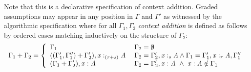 \begin{definition}
Note that this is a declarative specification of context addition. Graded
assumptions may appear in any position in $\Gamma$ and $\Gamma'$ as witnessed by
the algorithmic specification where for all $\Gamma_{{\mathrm{1}}}, \Gamma_{{\mathrm{2}}}$
  \emph{context addition} is defined
as follows by ordered cases matching inductively on the structure of
$\Gamma_{{\mathrm{2}}}$:
\begin{align*}
\Gamma_{{\mathrm{1}}}  \GRANULEsym{+}  \Gamma_{{\mathrm{2}}} = \left\{\begin{matrix}
    \begin{array}{ll}
    \Gamma_{{\mathrm{1}}} &
     \Gamma_{{\mathrm{2}}} = \emptyset
             \\
      ((\Gamma'_{{\mathrm{1}}}, \Gamma''_{{\mathrm{1}}}) + \Gamma'_{{\mathrm{2}}}), \GRANULEmv{x}  :_{\textcolor{coeffectColor}{  \GRANULEsym{(}  \GRANULEnt{r}  \GRANULEsym{+}  \GRANULEnt{s}  \GRANULEsym{)}  } }   \GRANULEnt{A} \; &
\Gamma_{{\mathrm{2}}} = \Gamma'_{{\mathrm{2}}}  \GRANULEsym{,}   \GRANULEmv{x}  :_{\textcolor{coeffectColor}{  \GRANULEnt{s}  } }   \GRANULEnt{A} \wedge \Gamma_{{\mathrm{1}}} = \Gamma'_{{\mathrm{1}}}  \GRANULEsym{,}   \GRANULEmv{x}  :_{\textcolor{coeffectColor}{  \GRANULEnt{r}  } }   \GRANULEnt{A},\Gamma''_{{\mathrm{1}}}  \\
 (\Gamma_{{\mathrm{1}}} + \Gamma'_{{\mathrm{2}}}), \GRANULEmv{x}  :  \GRANULEnt{A} & \Gamma_{{\mathrm{2}}} = \Gamma'_{{\mathrm{2}}}  \GRANULEsym{,}   \GRANULEmv{x}  :  \GRANULEnt{A}\ \wedge\  \GRANULEmv{x}  :  \GRANULEnt{A} \notin \Gamma_{{\mathrm{1}}}
    \end{array}
  \end{matrix}\right.
\end{align*}
\end{definition}

